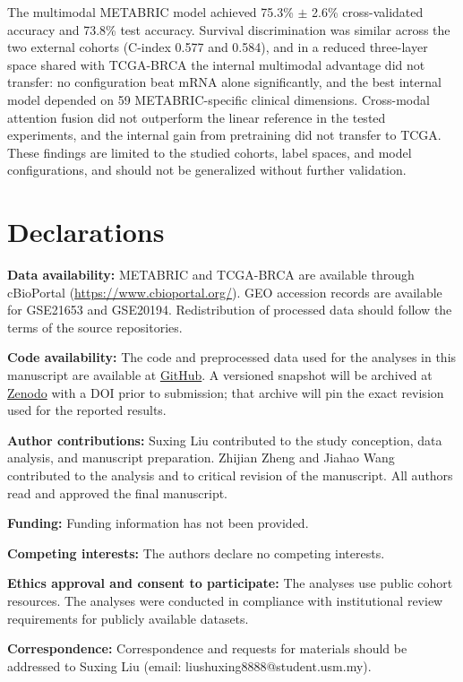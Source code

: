 \documentclass[10pt,journal,compsoc,twocolumn]{IEEEtran}
\begin{document}
The multimodal METABRIC model achieved 75.3\% $\pm$ 2.6\% cross-validated accuracy and 73.8\% test accuracy. Survival discrimination was similar across the two external cohorts (C-index 0.577 and 0.584), and in a reduced three-layer space shared with TCGA-BRCA the internal multimodal advantage did not transfer: no configuration beat mRNA alone significantly, and the best internal model depended on 59 METABRIC-specific clinical dimensions. Cross-modal attention fusion did not outperform the linear reference in the tested experiments, and the internal gain from pretraining did not transfer to TCGA. These findings are limited to the studied cohorts, label spaces, and model configurations, and should not be generalized without further validation.

\section*{Declarations}
\textbf{Data availability:} METABRIC and TCGA-BRCA are available through cBioPortal (\url{https://www.cbioportal.org/}). GEO accession records are available for GSE21653 and GSE20194. Redistribution of processed data should follow the terms of the source repositories.

\textbf{Code availability:} The code and preprocessed data used for the analyses in this manuscript are available at \href{https://github.com/HAHA12345677888/pam50-label-space}{GitHub}. A versioned snapshot will be archived at \href{https://zenodo.org}{Zenodo} with a DOI prior to submission; that archive will pin the exact revision used for the reported results.

\textbf{Author contributions:} Suxing Liu contributed to the study conception, data analysis, and manuscript preparation. Zhijian Zheng and Jiahao Wang contributed to the analysis and to critical revision of the manuscript. All authors read and approved the final manuscript.

\textbf{Funding:} Funding information has not been provided.

\textbf{Competing interests:} The authors declare no competing interests.

\textbf{Ethics approval and consent to participate:} The analyses use public cohort resources. The analyses were conducted in compliance with institutional review requirements for publicly available datasets.

\textbf{Correspondence:} Correspondence and requests for materials should be addressed to Suxing Liu (email: liushuxing8888@student.usm.my).



\end{document}
